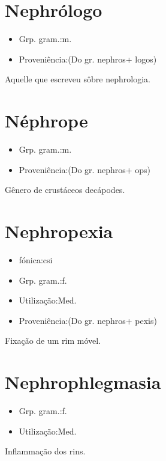 \section{Nephrólogo}
\begin{itemize}
\item {Grp. gram.:m.}
\end{itemize}
\begin{itemize}
\item {Proveniência:(Do gr. \textunderscore nephros\textunderscore  + \textunderscore logos\textunderscore )}
\end{itemize}
Aquelle que escreveu sôbre nephrologia.
\section{Néphrope}
\begin{itemize}
\item {Grp. gram.:m.}
\end{itemize}
\begin{itemize}
\item {Proveniência:(Do gr. \textunderscore nephros\textunderscore  + \textunderscore ops\textunderscore )}
\end{itemize}
Gênero de crustáceos decápodes.
\section{Nephropexia}
\begin{itemize}
\item {fónica:csi}
\end{itemize}
\begin{itemize}
\item {Grp. gram.:f.}
\end{itemize}
\begin{itemize}
\item {Utilização:Med.}
\end{itemize}
\begin{itemize}
\item {Proveniência:(Do gr. \textunderscore nephros\textunderscore  + \textunderscore pexis\textunderscore )}
\end{itemize}
Fixação de um rim móvel.
\section{Nephrophlegmasia}
\begin{itemize}
\item {Grp. gram.:f.}
\end{itemize}
\begin{itemize}
\item {Utilização:Med.}
\end{itemize}
Inflammação dos rins.
